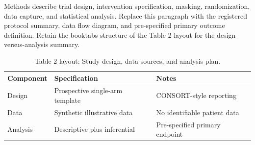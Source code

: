 
Methods describe trial design, intervention specification, masking, randomization, data capture, and statistical analysis. Replace this paragraph with the registered protocol summary, data flow diagram, and pre-specified primary outcome definition. Retain the booktabs structure of the Table 2 layout for the design-versus-analysis summary.

\begin{table}[H]
\caption{Table 2 layout: Study design, data sources, and analysis plan.}
\label{tab:methods_design}
\centering
\begin{tabular}{>{\raggedright\arraybackslash}p{3.4cm} >{\raggedright\arraybackslash}p{4.6cm} >{\raggedright\arraybackslash}p{5.4cm}}
\toprule
\textbf{Component} & \textbf{Specification} & \textbf{Notes} \\
\midrule
  Design & Prospective single-arm template & CONSORT-style reporting \\
  Data & Synthetic illustrative data & No identifiable patient data \\
  Analysis & Descriptive plus inferential & Pre-specified primary endpoint \\
\bottomrule
\end{tabular}
\end{table}
